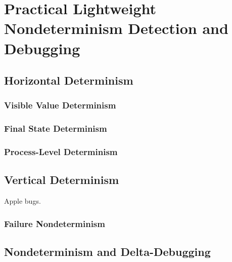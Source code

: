 \section{Practical Lightweight Nondeterminism
  Detection and Debugging}

\subsection{Horizontal Determinism}

\subsubsection{Visible Value Determinism}

\subsubsection{Final State Determinism}

\subsubsection{Process-Level Determinism}

\subsection{Vertical Determinism}

Apple bugs.

\subsubsection{Failure Nondeterminism}

\subsection{Nondeterminism and Delta-Debugging}